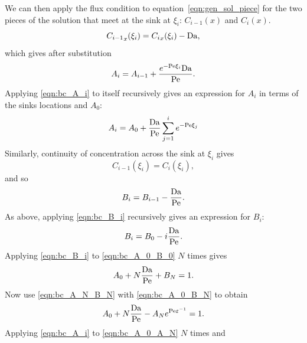 We can then apply the flux condition to equation~\eqref{eqn:gen_sol_piece} for
the two pieces of the solution that meet at the sink at \(\xi_i\):
\(C_{i-1}(x)\) and \(C_i(x)\).
\begin{equation*}
    {C_{i-1}}_x(\xi_i) = {C_i}_x(\xi_i) - \Da,%
\end{equation*}
which gives after substitution
\begin{equation}
    \label{eqn:bc_A_i}
    A_i = A_{i-1} + \frac{e^{-\mathrm{Pe} \xi_i}\mathrm{Da}}{\mathrm{Pe}}.
\end{equation}
Applying \eqref{eqn:bc_A_i} to itself recursively gives an expression for
\(A_i\) in terms of the sinks locations and \(A_0\):
\begin{equation}
    \label{eqn:A_i}
    A_i = A_0 + \frac{\mathrm{Da}}{\mathrm{Pe}}\sum_{j=1}^{i} e^{-\mathrm{Pe} \xi_j}
\end{equation}
Similarly, continuity of concentration across the sink at \(\xi_i\) gives
\begin{equation*}
    C_{i-1}(\xi_i) = C_i(\xi_i),
\end{equation*}
and so
\begin{equation}
    \label{eqn:bc_B_i}
    B_i = B_{i-1}-\frac{\mathrm{Da}}{\mathrm{Pe}}.
\end{equation}
As above, applying \eqref{eqn:bc_B_i} recursively gives an expression for
\(B_i\):
\begin{equation}
    \label{eqn:B_i}
    B_i = B_0 - i\frac{\mathrm{Da}}{\mathrm{Pe}}.
\end{equation}
Applying \eqref{eqn:bc_B_i} to \eqref{eqn:bc_A_0_B_0} \(N\) times gives
\begin{equation}
    \label{eqn:bc_A_0_B_N}
    A_0 + N \frac{\mathrm{Da}}{\mathrm{Pe}} + B_N = 1.
\end{equation}
Now use \eqref{eqn:bc_A_N_B_N} with \eqref{eqn:bc_A_0_B_N} to obtain
\begin{equation}
    \label{eqn:bc_A_0_A_N}
    A_0 + N \frac{\mathrm{Da}}{\mathrm{Pe}} - A_N e^{\mathrm{Pe} \varepsilon^{-1}} = 1.
\end{equation}
Applying \eqref{eqn:bc_A_i} to \eqref{eqn:bc_A_0_A_N} \(N\) times and
